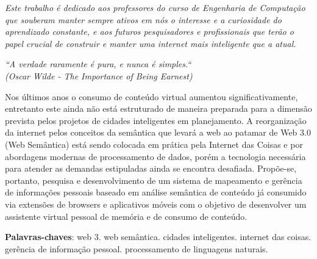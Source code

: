 \documentclass[
	12pt,				%
	openright,			%
	twoside,			%
	a4paper,			%
	english,			%
	french,				%
	spanish,			%
	brazil				%
	]{abntex2}
\begin{document}
\begin{dedicatoria}
   \vspace*{\fill}
   \centering
   \noindent
   \textit{ Este trabalho é dedicado aos professores do curso de Engenharia de Computação que souberam manter sempre ativos em nós o interesse e a curiosidade do aprendizado constante, e aos futuros pesquisadores e profissionais que terão o papel crucial de construir e manter uma internet mais inteligente que a atual. } \vspace*{\fill}
\end{dedicatoria}

\begin{epigrafe}
    \vspace*{\fill}
	\begin{flushright}
		\textit{``A verdade raramente é pura, e nunca é simples.`` \\
		(Oscar Wilde - The Importance of Being Earnest)}
	\end{flushright}
\end{epigrafe}


\setlength{\absparsep}{18pt} %
\begin{resumo}
 Nos últimos anos o consumo de conteúdo virtual aumentou significativamente, entretanto este ainda não está estruturado de maneira preparada para a dimensão prevista pelos projetos de cidades inteligentes em planejamento. A reorganização da internet pelos conceitos da semântica que levará a web ao patamar de Web 3.0 (Web Semântica) está sendo colocada em prática pela Internet das Coisas e por abordagens modernas de processamento de dados, porém a tecnologia necessária para atender as demandas estipuladas ainda se encontra desafiada. Propõe-se, portanto, pesquisa e desenvolvimento de um sistema de mapeamento e gerência de informações pessoais baseado em análise semântica de conteúdo já consumido via extensões de browsers e aplicativos móveis com o objetivo de desenvolver um assistente virtual pessoal de memória e de consumo de conteúdo.

 \textbf{Palavras-chaves}: web 3. web semântica. cidades inteligentes. internet das coisas. gerência de informação pessoal. processamento de linguagens naturais.
\end{resumo}
\end{document}
